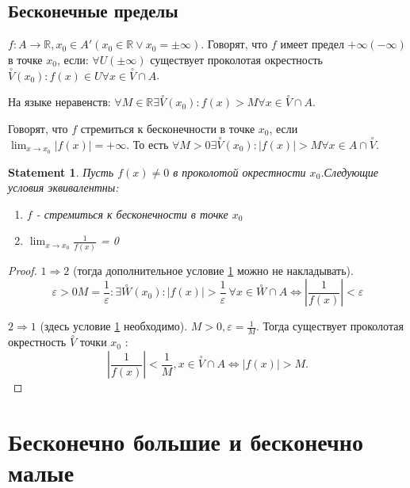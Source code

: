 \documentclass[11pt]{book}
\newcommand{\R}{\mathbb{R}}
\newcommand{\pivi}{\stackrel \circ }
\theoremstyle{definition}
\theoremstyle{plain}
\theoremstyle{plain}
\newtheorem*{st}{Statement}
\theoremstyle{definition}
\theoremstyle{remark}
\begin{document}
\subsection{Бесконечные пределы}\label{ques_38}
\begin{defn}
    $f: A \to \R, x_0 \in A' (x_0 \in  \R \vee x_0 = \pm \infty)$.
    Говорят, что $f $ имеет предел $+\infty (-\infty)$ в точке $x_0$, если: $\forall U(\pm \infty)$ существует проколотая окрестность $\pivi V(x_0): f(x) \in  U \forall x \in  \pivi V \cap A$.

    На языке неравенств: $\forall M \in \R \exists \pivi V (x_0) : f(x) > M \forall x \in  \pivi V \cap A$.
\end{defn}
\begin{defn}
    Говорят, что $f$ стремиться к бесконечности в точке $x_0$, если $\lim_{x \to x_0} |f(x)| = +\infty$. То есть $\forall  M >0 \exists \pivi V(x_0): |f(x)| > M \forall x \in  A \cap \pivi V$.
\end{defn}
\begin{st}
    Пусть $f(x) \ne 0$ в проколотой окрестности $x_0$.\label{inf_if}
    Следующие условия эквивалентны: 
    \begin{enumerate}
        \item $f$ - стремиться к бесконечности в точке  $x_0$
	\item $\lim_{x \to  x_0} \frac{1}{f(x)}$ = 0
    \end{enumerate}
\end{st}
\begin{proof}
    $1 \Rightarrow 2$ (тогда дополнительное условие \ref{inf_if} можно не накладывать).
    $$\varepsilon  >0 M = \frac{1}{\varepsilon }: \exists \pivi W(x_0): |f(x)| > \frac{1}{\varepsilon } ~ \forall x \in  \pivi W \cap A \Leftrightarrow \left |\frac{1}{f(x)} \right |< \varepsilon $$

    $2 \Rightarrow  1$ (здесь условие \ref{inf_if} необходимо). 
    $M > 0, \varepsilon  = \frac{1}{M}$. Тогда существует проколотая окрестность $\pivi V$ точки $x_0$ :
    \[
	\left | \frac{1}{f(x)} \right | < \frac{1}{M}, x \in  \pivi V \cap A \Longleftrightarrow |f(x) |> M
    .\] 
\end{proof}
\section{Бесконечно большие и бесконечно малые}
\end{document}
